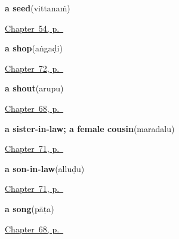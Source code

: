 \noindent\begin{minipage}[t]{\linewidth}
\raggedright
\textbf{a seed}\enspace\emph{}\enspace(vittanaṁ)\par
\footnotesize \hyperref[ch:te-tree]{Chapter~54, p.~\pageref*{ch:te-tree}}
\end{minipage}\par\smallskip

\noindent\begin{minipage}[t]{\linewidth}
\raggedright
\textbf{a shop}\enspace\emph{}\enspace(aṅgaḍi)\par
\footnotesize \hyperref[ch:te-the-market]{Chapter~72, p.~\pageref*{ch:te-the-market}}
\end{minipage}\par\smallskip

\noindent\begin{minipage}[t]{\linewidth}
\raggedright
\textbf{a shout}\enspace\emph{}\enspace(arupu)\par
\footnotesize \hyperref[ch:te-sound-and-voice]{Chapter~68, p.~\pageref*{ch:te-sound-and-voice}}
\end{minipage}\par\smallskip

\noindent\begin{minipage}[t]{\linewidth}
\raggedright
\textbf{a sister-in-law; a female cousin}\enspace\emph{}\enspace(maradalu)\par
\footnotesize \hyperref[ch:te-the-wider-family]{Chapter~71, p.~\pageref*{ch:te-the-wider-family}}
\end{minipage}\par\smallskip

\noindent\begin{minipage}[t]{\linewidth}
\raggedright
\textbf{a son-in-law}\enspace\emph{}\enspace(alluḍu)\par
\footnotesize \hyperref[ch:te-the-wider-family]{Chapter~71, p.~\pageref*{ch:te-the-wider-family}}
\end{minipage}\par\smallskip

\noindent\begin{minipage}[t]{\linewidth}
\raggedright
\textbf{a song}\enspace\emph{}\enspace(pāṭa)\par
\footnotesize \hyperref[ch:te-sound-and-voice]{Chapter~68, p.~\pageref*{ch:te-sound-and-voice}}
\end{minipage}\par\smallskip

